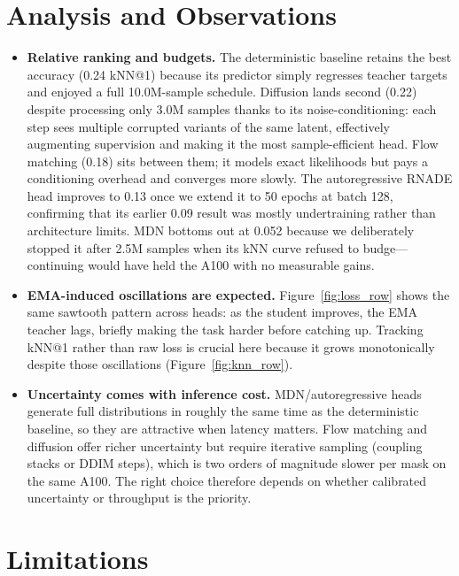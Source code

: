 \documentclass[conference]{IEEEtran}
\begin{document}
\section{Analysis and Observations}
\begin{itemize}
    \item \textbf{Relative ranking and budgets.} The deterministic baseline retains the best accuracy (0.24 kNN@1) because its predictor simply regresses teacher targets and enjoyed a full 10.0M-sample schedule. Diffusion lands second (0.22) despite processing only 3.0M samples thanks to its noise-conditioning: each step sees multiple corrupted variants of the same latent, effectively augmenting supervision and making it the most sample-efficient head. Flow matching (0.18) sits between them; it models exact likelihoods but pays a conditioning overhead and converges more slowly. The autoregressive RNADE head improves to 0.13 once we extend it to 50 epochs at batch 128, confirming that its earlier 0.09 result was mostly undertraining rather than architecture limits. MDN bottoms out at 0.052 because we deliberately stopped it after 2.5M samples when its kNN curve refused to budge—continuing would have held the A100 with no measurable gains.
    \item \textbf{EMA-induced oscillations are expected.} Figure~\ref{fig:loss_row} shows the same sawtooth pattern across heads: as the student improves, the EMA teacher lags, briefly making the task harder before catching up. Tracking kNN@1 rather than raw loss is crucial here because it grows monotonically despite those oscillations (Figure~\ref{fig:knn_row}).
    \item \textbf{Uncertainty comes with inference cost.} MDN/autoregressive heads generate full distributions in roughly the same time as the deterministic baseline, so they are attractive when latency matters. Flow matching and diffusion offer richer uncertainty but require iterative sampling (coupling stacks or DDIM steps), which is two orders of magnitude slower per mask on the same A100. The right choice therefore depends on whether calibrated uncertainty or throughput is the priority.
\end{itemize}

\section{Limitations}
\end{document}
